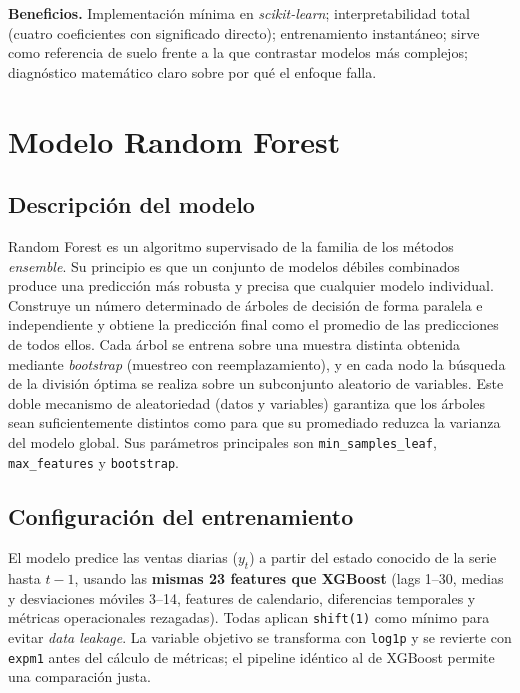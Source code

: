 \documentclass[11pt,a4paper]{article}
\begin{document}
\textbf{Beneficios.} Implementación mínima en \textit{scikit-learn}; interpretabilidad total (cuatro coeficientes con significado directo); entrenamiento instantáneo; sirve como referencia de suelo frente a la que contrastar modelos más complejos; diagnóstico matemático claro sobre por qué el enfoque falla.

\section{Modelo Random Forest}

\subsection{Descripción del modelo}

Random Forest es un algoritmo supervisado de la familia de los métodos \textit{ensemble}. Su principio es que un conjunto de modelos débiles combinados produce una predicción más robusta y precisa que cualquier modelo individual. Construye un número determinado de árboles de decisión de forma paralela e independiente y obtiene la predicción final como el promedio de las predicciones de todos ellos. Cada árbol se entrena sobre una muestra distinta obtenida mediante \textit{bootstrap} (muestreo con reemplazamiento), y en cada nodo la búsqueda de la división óptima se realiza sobre un subconjunto aleatorio de variables. Este doble mecanismo de aleatoriedad (datos y variables) garantiza que los árboles sean suficientemente distintos como para que su promediado reduzca la varianza del modelo global. Sus parámetros principales son \texttt{min\_samples\_leaf}, \texttt{max\_features} y \texttt{bootstrap}.

\subsection{Configuración del entrenamiento}

El modelo predice las ventas diarias ($y_t$) a partir del estado conocido de la serie hasta $t-1$, usando las \textbf{mismas 23 features que XGBoost} (lags 1--30, medias y desviaciones móviles 3--14, features de calendario, diferencias temporales y métricas operacionales rezagadas). Todas aplican \texttt{shift(1)} como mínimo para evitar \textit{data leakage}. La variable objetivo se transforma con \texttt{log1p} y se revierte con \texttt{expm1} antes del cálculo de métricas; el pipeline idéntico al de XGBoost permite una comparación justa.
\end{document}
